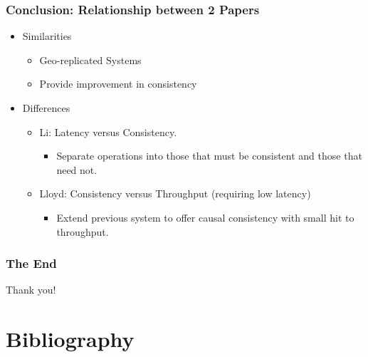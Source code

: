 \documentclass{beamer}
\begin{document}
\begin{frame}
\frametitle{Conclusion: Relationship between 2 Papers}
\begin{itemize}
\item Similarities
	\begin{itemize}
		\item Geo-replicated Systems
		\item Provide improvement in consistency
	\end{itemize}
\item Differences
	\begin{itemize}
		\item Li: Latency versus Consistency.
			\begin{itemize}
				\item Separate operations into those that must be consistent and those that need not.
			\end{itemize}
		\item Lloyd: Consistency versus Throughput (requiring low latency)
			\begin{itemize}
				\item Extend previous system to offer causal consistency with small hit to throughput.
			\end{itemize}
	\end{itemize}

\end{itemize}  
\end{frame}

\begin{frame}
\frametitle{The End}
\LARGE{Thank you!}
\end{frame}



\section{Bibliography} 
\end{document}
